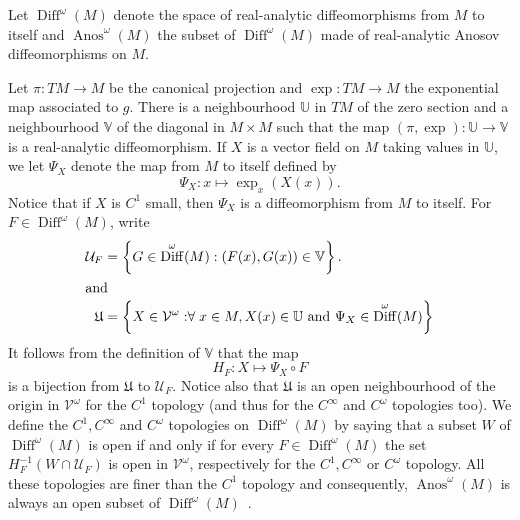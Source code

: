\documentclass[10pt]{amsart}
\theoremstyle{definition}\newtheorem{defi}[theo]{Definition}\newtheorem{rema}[theo]{Remark}\newtheorem{exam}[theo]{Example}\newtheorem{exem}[theo]{Example}\newtheorem{nota}[theo]{Notation}
\DeclareMathOperator{\Diff}{Diff}
\DeclareMathOperator{\Anos}{Anos}
\newcommand{\set}[1]{\left\{ #1 \right\}}
\newcommand{\p}[1]{\left(#1\right)}
\newcommand{\clV}{\mathcal{V}}
\newcommand{\clU}{\mathcal{U}}
\newcommand{\fkU}{\mathfrak{U}}
\newcommand{\bbU}{\mathbb{U}}
\newcommand{\bbV}{\mathbb{V}}
\let\oldforall\forall
\renewcommand*{\forall}{\mathrel{\oldforall}}
\begin{document}
Let $\Diff^\omega(M)$ denote the space of real-analytic diffeomorphisms from $M$ to itself and $\Anos^\omega(M)$ the subset of $\Diff^\omega(M)$ made of real-analytic Anosov diffeomorphisms on $M$.

Let $\pi : TM \to M$ be the canonical projection and $\exp : TM \to M$ the exponential map associated to $g$. There is a neighbourhood $\bbU$ in $TM$ of the zero section and a neighbourhood $\bbV$ of the diagonal in $M \times M$ such that the map $(\pi,\exp) : \bbU \to \bbV$ is a real-analytic diffeomorphism. If $X$ is a vector field on $M$ taking values in $\bbU$, we let $\Psi_X$ denote the map from $M$ to itself defined by
\begin{equation}\label{eq:near_identity}
\Psi_X : x \mapsto \exp_x(X(x)).
\end{equation}
Notice that if $X$ is $C^1$ small, then $\Psi_X$ is a diffeomorphism from $M$ to itself. For $F \in \Diff^\omega(M)$, write
\begin{align*}
\clU_F &= \set{ G \in \Diff^\omega(M): (F(x),G(x)) \in \bbV}.
\\
\intertext{and}
\fkU &= \set{ X \in \clV^\omega : \forall x \in M, X(x) \in \bbU \text{ and } \Psi_X \in \Diff^\omega(M)}
\end{align*}
It follows from the definition of $\bbV$ that the map
\begin{equation*}
H_F : X \mapsto \Psi_X \circ F
\end{equation*}
is a bijection from $\fkU$ to $\clU_F$. Notice also that $\fkU$ is an open neighbourhood of the origin in $\clV^\omega$ for the $C^1$ topology (and thus for the $C^\infty$ and $C^\omega$ topologies too). We define the $C^1, C^\infty$ and $C^\omega$ topologies on $\Diff^\omega(M)$ by saying that a subset $W$ of $\Diff^\omega(M)$ is open if and only if for every $F \in \Diff^\omega(M)$ the set $H_F^{-1}\p{W \cap
\clU_F}$ is open in $\clV^\omega$, respectively for the $C^1,C^\infty$ or $C^\omega$ topology. All these topologies are finer than the $C^1$ topology and consequently, $\Anos^\omega(M)$ is always an open subset of $\Diff^\omega(M)$~\cite{original_anosov}.
\end{document}
